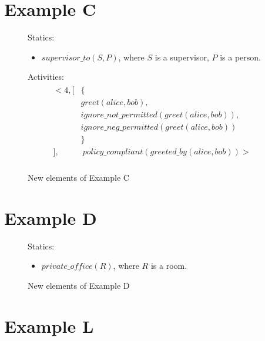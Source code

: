 \section{Example C}

\begin{figure}[H]
    \begin{framed}
        Statics:
        \begin{itemize}
            \item $supervisor\_to(S, P)$, where $S$ is a supervisor, $P$ is a person.
        \end{itemize}

        Activities:
        \begin{gather}
        \begin{split}
            <4, [
                & \{ \\
                & greet(alice, bob), \\
                & ignore\_not\_permitted(greet(alice, bob)), \\
                & ignore\_neg\_permitted(greet(alice, bob)) \\
                & \} \\
            ], & \ policy\_compliant(greeted\_by(alice, bob))>
        \end{split} \\
        \end{gather}
    \end{framed}
    \caption{New elements of Example C}
    \label{fig:apia_example_c_description}
\end{figure}

\section{Example D}

\begin{figure}[H]
    \begin{framed}
        Statics:
        \begin{itemize}
            \item $private\_office(R)$, where $R$ is a room.
        \end{itemize}
    \end{framed}
    \caption{New elements of Example D}
    \label{fig:apia_example_d_description}
\end{figure}

\section{Example L}

